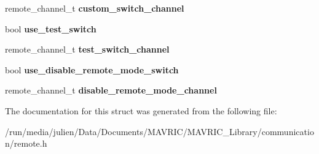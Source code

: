 \begin{DoxyCompactItemize}
\item 
\hypertarget{structremote__mode__conf__t_a656f7e86e312e32b20d899ede42d68e6}{remote\+\_\+channel\+\_\+t {\bfseries custom\+\_\+switch\+\_\+channel}}\label{structremote__mode__conf__t_a656f7e86e312e32b20d899ede42d68e6}

\item 
\hypertarget{structremote__mode__conf__t_a6e23d8d5633aa7622a8127c47b336610}{bool {\bfseries use\+\_\+test\+\_\+switch}}\label{structremote__mode__conf__t_a6e23d8d5633aa7622a8127c47b336610}

\item 
\hypertarget{structremote__mode__conf__t_aaa7f4c86612298d8b1483a1d6bee24c6}{remote\+\_\+channel\+\_\+t {\bfseries test\+\_\+switch\+\_\+channel}}\label{structremote__mode__conf__t_aaa7f4c86612298d8b1483a1d6bee24c6}

\item 
\hypertarget{structremote__mode__conf__t_a98bdbfefe26ea85939311c1e888784a9}{bool {\bfseries use\+\_\+disable\+\_\+remote\+\_\+mode\+\_\+switch}}\label{structremote__mode__conf__t_a98bdbfefe26ea85939311c1e888784a9}

\item 
\hypertarget{structremote__mode__conf__t_a5110221fbb530cdead15fe70c85ca5b6}{remote\+\_\+channel\+\_\+t {\bfseries disable\+\_\+remote\+\_\+mode\+\_\+channel}}\label{structremote__mode__conf__t_a5110221fbb530cdead15fe70c85ca5b6}

\end{DoxyCompactItemize}


The documentation for this struct was generated from the following file\+:\begin{DoxyCompactItemize}
\item 
/run/media/julien/\+Data/\+Documents/\+M\+A\+V\+R\+I\+C/\+M\+A\+V\+R\+I\+C\+\_\+\+Library/communication/remote.\+h\end{DoxyCompactItemize}
